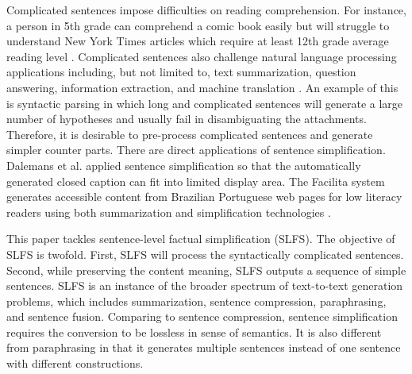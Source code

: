 \documentclass[10pt]{article}
\begin{document}
Complicated sentences impose difficulties on reading comprehension.
For instance, a person in 5th grade can comprehend a comic book easily but will struggle to understand New York Times articles which require at least 12th grade average reading level \cite{Flesch:1981}.
Complicated sentences also challenge natural language processing applications including, but not limited to, text summarization, question answering, information extraction, and machine translation \cite{Chandrasekar:1996}. 
An example of this is syntactic parsing in which long and complicated sentences will generate a large number of hypotheses and usually fail in disambiguating the attachments.
Therefore, it is desirable to pre-process complicated sentences and generate simpler counter parts. 
There are direct applications of sentence simplification.
Dalemans et al.  applied sentence simplification so that the automatically generated closed caption can fit into limited display area. 
The Facilita system generates accessible content from Brazilian Portuguese web pages for low literacy readers using both summarization and simplification technologies \cite{watanabe-et-al:2009}.

This paper tackles sentence-level factual simplification (SLFS). 
The objective of SLFS is twofold.
First, SLFS will process the syntactically complicated sentences.
Second, while preserving the content meaning, SLFS outputs a sequence of simple sentences. 
SLFS is an instance of the broader spectrum of text-to-text generation problems, which includes summarization, sentence compression, paraphrasing, and sentence fusion. 
Comparing to sentence compression, sentence simplification requires the conversion to be lossless in sense of semantics. 
It is also different from paraphrasing in that it generates multiple sentences instead of one sentence with different constructions. 

\end{document}
